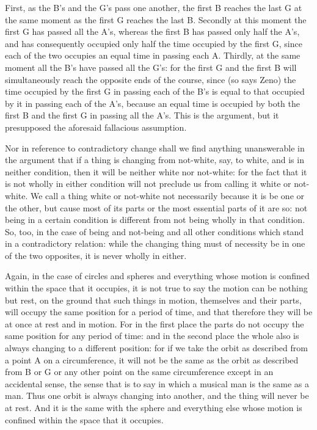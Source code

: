 First, as the B's and the G's pass one another, the first B reaches
the last G at the same moment as the first G reaches the last B. Secondly
at this moment the first G has passed all the A's, whereas the first
B has passed only half the A's, and has consequently occupied only
half the time occupied by the first G, since each of the two occupies
an equal time in passing each A. Thirdly, at the same moment all the
B's have passed all the G's: for the first G and the first B will
simultaneously reach the opposite ends of the course, since (so says
Zeno) the time occupied by the first G in passing each of the B's
is equal to that occupied by it in passing each of the A's, because
an equal time is occupied by both the first B and the first G in passing
all the A's. This is the argument, but it presupposed the aforesaid
fallacious assumption. 

Nor in reference to contradictory change shall we find anything unanswerable
in the argument that if a thing is changing from not-white, say, to
white, and is in neither condition, then it will be neither white
nor not-white: for the fact that it is not wholly in either condition
will not preclude us from calling it white or not-white. We call a
thing white or not-white not necessarily because it is be one or the
other, but cause most of its parts or the most essential parts of
it are so: not being in a certain condition is different from not
being wholly in that condition. So, too, in the case of being and
not-being and all other conditions which stand in a contradictory
relation: while the changing thing must of necessity be in one of
the two opposites, it is never wholly in either. 

Again, in the case of circles and spheres and everything whose motion
is confined within the space that it occupies, it is not true to say
the motion can be nothing but rest, on the ground that such things
in motion, themselves and their parts, will occupy the same position
for a period of time, and that therefore they will be at once at rest
and in motion. For in the first place the parts do not occupy the
same position for any period of time: and in the second place the
whole also is always changing to a different position: for if we take
the orbit as described from a point A on a circumference, it will
not be the same as the orbit as described from B or G or any other
point on the same circumference except in an accidental sense, the
sense that is to say in which a musical man is the same as a man.
Thus one orbit is always changing into another, and the thing will
never be at rest. And it is the same with the sphere and everything
else whose motion is confined within the space that it occupies.

